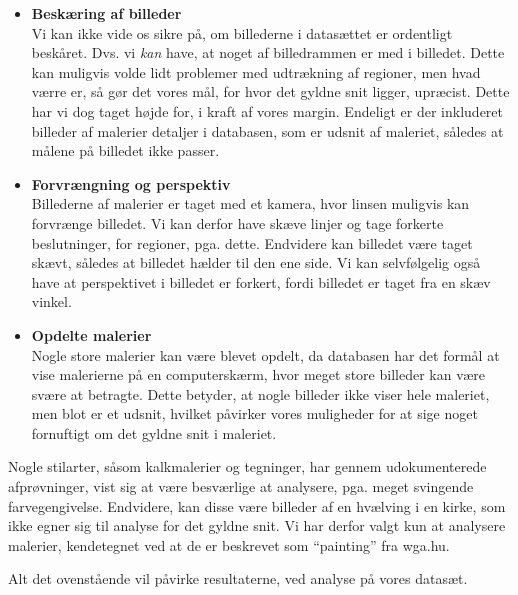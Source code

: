 {\begin{itemize}
    \item \textbf{Beskæring af billeder}\\
        Vi kan ikke vide os sikre på, om billederne i datasættet er
        ordentligt beskåret. Dvs. vi \emph{kan} have, at noget af
        billedrammen er med i billedet. Dette kan muligvis volde lidt
        problemer med udtrækning af regioner, men hvad værre er, så gør
        det vores mål, for hvor det gyldne snit ligger, upræcist. Dette
        har vi dog taget højde for, i kraft af vores margin.  Endeligt
        er der inkluderet billeder af malerier detaljer i databasen, som
        er udsnit af maleriet, således at målene på billedet ikke
        passer.
    \item \textbf{Forvrængning og perspektiv}\\
        Billederne af malerier er taget med et kamera, hvor linsen muligvis kan
        forvrænge billedet. Vi kan derfor have skæve linjer og tage
        forkerte beslutninger, for regioner, pga. dette. Endvidere kan
        billedet være taget skævt, således at billedet hælder til den
        ene side. Vi kan selvfølgelig også have at perspektivet i
        billedet er forkert, fordi billedet er taget fra en skæv vinkel.
    \item \textbf{Opdelte malerier}\\
        Nogle store malerier kan være blevet opdelt, da databasen har
        det formål at vise malerierne på en computerskærm, hvor meget
        store billeder kan være svære at betragte. Dette betyder, at
        nogle billeder ikke viser hele maleriet, men blot er et udsnit,
        hvilket påvirker vores muligheder for at sige noget fornuftigt
        om det gyldne snit i maleriet.
\end{itemize}

Nogle stilarter, såsom kalkmalerier og tegninger, har gennem
udokumenterede afprøvninger, vist sig at være besværlige at analysere,
pga. meget svingende farvegengivelse. Endvidere, kan disse være billeder
af en hvælving i en kirke, som ikke egner sig til analyse for det gyldne
snit. Vi har derfor valgt kun at analysere malerier, kendetegnet ved at
de er beskrevet som ``painting'' fra wga.hu.

Alt det ovenstående vil påvirke resultaterne, ved analyse på vores
datasæt.

}
